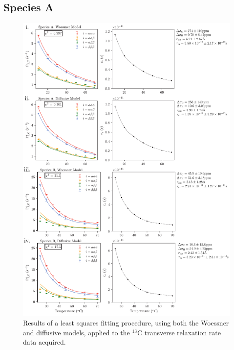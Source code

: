 \subsection{Species A}
\begin{figure}
\centering
\includegraphics[scale=0.9]{./Figures/SimonsFigs/Fits.pdf}
\caption{Results of a least squares fitting procedure, using both the Woessner and diffusive models, applied to the $^{13}$C transverse relaxation rate data acquired.}
\label{Fits}
\end{figure}
